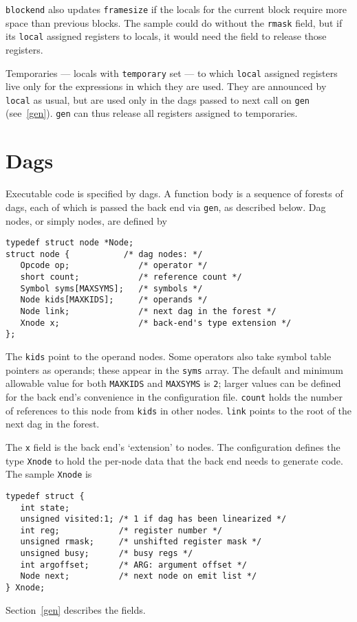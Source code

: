 \noindent
\verb|blockend| also updates \verb|framesize| if the locals for the current
block require more space than previous blocks.
The sample could do without the \verb|rmask| field, but
if its \verb|local| assigned registers to locals, it would need
the field to release those registers.

Temporaries --- locals with \verb|temporary| set --- to which
\verb|local| assigned registers live only for the expressions in which
they are used.  They are announced by \verb|local| as usual, but are
used only in the dags passed to next call on \verb|gen|
(see~\ref{gen}).  \verb|gen| can thus release all registers assigned to
temporaries.


\section{Dags}

\label{dags}
Executable code is specified by dags.  A function body is a sequence of
forests of dags, each of which is passed the back end via \verb|gen|,
as described below.  Dag nodes, or simply nodes, are defined by
\begin{verbatim}
typedef struct node *Node;
struct node {           /* dag nodes: */
   Opcode op;              /* operator */
   short count;            /* reference count */
   Symbol syms[MAXSYMS];   /* symbols */
   Node kids[MAXKIDS];     /* operands */
   Node link;              /* next dag in the forest */
   Xnode x;                /* back-end's type extension */
};
\end{verbatim}

The \verb|kids| point to the operand nodes.  Some operators also
take symbol table pointers as operands; these appear in the \verb|syms|
array.  The default and minimum allowable value for both \verb|MAXKIDS|
and \verb|MAXSYMS| is \verb|2|; larger values can be defined for the
back end's convenience in the configuration file. \verb|count|
holds the number of references to this node from \verb|kids| in other
nodes. \verb|link| points to the root of the next dag in the forest.

The \verb|x| field is the back end's `extension' to nodes.  The
configuration defines the type \verb|Xnode| to hold the per-node data
that the back end needs to generate code.  The sample \verb|Xnode| is
\begin{verbatim}
typedef struct {
   int state;
   unsigned visited:1; /* 1 if dag has been linearized */
   int reg;            /* register number */
   unsigned rmask;     /* unshifted register mask */
   unsigned busy;      /* busy regs */
   int argoffset;      /* ARG: argument offset */
   Node next;          /* next node on emit list */
} Xnode;
\end{verbatim}
Section~\ref{gen} describes the fields.

